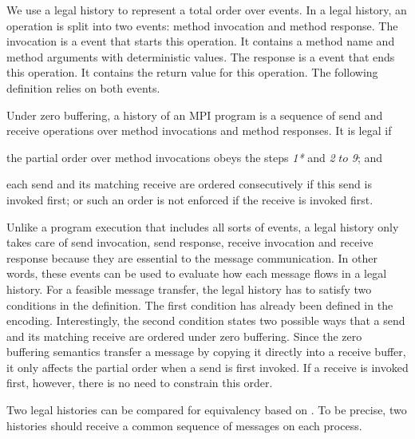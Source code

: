 We use a legal history to represent a total order over events. In a legal history, an operation is split into two events: method invocation and method response. The invocation is a event that starts this operation. It contains a method name and method arguments with deterministic values. The response is a event that ends this operation. It contains the return value for this operation. The following definition relies on both events.

\begin{definition}
Under zero buffering, a history of an MPI program is a sequence of send and receive operations over method invocations and method responses. It is legal if
\begin{compactenum}
\item the partial order over method invocations obeys the steps \textit{1*} and \textit{2} $to$ \textit{9}; and 
\item each send and its matching receive are ordered consecutively if this send is invoked first; or such an order is not enforced if the receive is invoked first.
\end{compactenum}
\end{definition}

Unlike a program execution that includes all sorts of events, a legal history only takes care of send invocation, send response, receive invocation and receive response because they are essential to the message communication. In other words, these events can be used to evaluate how each message flows in a legal history. For a feasible message transfer, the legal history has to satisfy two conditions in the definition. The first condition has already been defined in the encoding. Interestingly, the second condition states two possible ways that a send and its matching receive are ordered under zero buffering. Since the zero buffering semantics transfer a message by copying it directly into a receive buffer, it only affects the partial order when a send is first invoked. If a receive is invoked first, however, there is no need to constrain this order. 


Two legal histories can be compared for equivalency based on . To be precise, two histories should receive a common sequence of messages on each process. 

